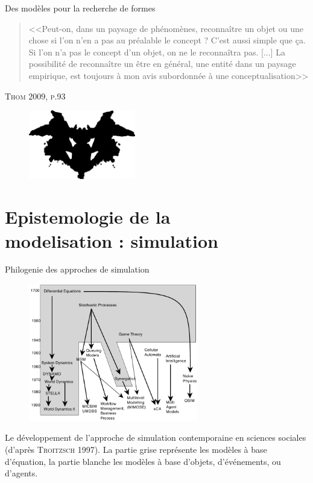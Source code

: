 \documentclass[newPxFont]{beamer}
\begin{document}
\begin{frame}[c]{Des modèles pour la recherche de formes}
  \vspace{-1em}
  \begin{quote}
    <<Peut-on, dans un paysage de phénomènes, reconnaître un objet ou une chose si l'on n'en a pas au préalable le concept ? C'est aussi simple que ça. Si l'on n'a pas le concept d'un objet, on ne le reconnaîtra pas. [...] La possibilité de reconnaître un être en général, une entité dans un paysage empirique, est toujours à mon avis subordonnée à une conceptualisation>>
  \end{quote}
  \hspace*{\fill}\textsc{Thom 2009, p.93}
  \vspace{-0.5em}
  \begin{figure}
   \includegraphics[height=3cm]{img/a_rorschach.png}
  \end{figure}
\end{frame}

\section{Epistemologie de la\\ modelisation : simulation}

\begin{frame}[c]{Philogenie des approches de simulation}
  \vspace{-2em}
  \begin{figure}
   \includegraphics[height=6cm]{img/a_troitzsch_1997.png}
  \end{figure}
  \vspace{-0.8em}
  \small{Le développement de l'approche de simulation contemporaine en sciences sociales (d'après \textsc{Troitzsch} 1997). La partie grise représente les modèles à base d'équation, la partie blanche les modèles à base d'objets, d'événements, ou d'agents}.
\end{frame}
\end{document}
